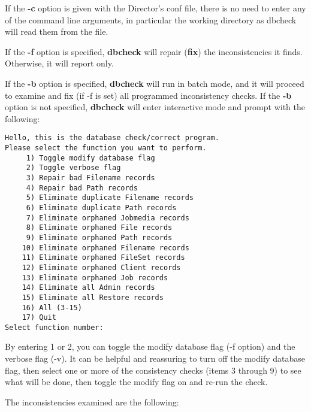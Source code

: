If the {\bf -c} option is given with the Director's conf file, there is no
need to enter any of the command line arguments, in particular the working
directory as dbcheck will read them from the file. 

If the {\bf -f} option is specified, {\bf dbcheck} will repair ({\bf fix}) the
inconsistencies it finds. Otherwise, it will report only. 

If the {\bf -b} option is specified, {\bf dbcheck} will run in batch mode, and
it will proceed to examine and fix (if -f is set) all programmed inconsistency
checks. If the {\bf -b} option is not specified, {\bf dbcheck} will enter
interactive mode and prompt with the following: 

\footnotesize
\begin{verbatim}
Hello, this is the database check/correct program.
Please select the function you want to perform.
     1) Toggle modify database flag
     2) Toggle verbose flag
     3) Repair bad Filename records
     4) Repair bad Path records
     5) Eliminate duplicate Filename records
     6) Eliminate duplicate Path records
     7) Eliminate orphaned Jobmedia records
     8) Eliminate orphaned File records
     9) Eliminate orphaned Path records
    10) Eliminate orphaned Filename records
    11) Eliminate orphaned FileSet records
    12) Eliminate orphaned Client records
    13) Eliminate orphaned Job records
    14) Eliminate all Admin records
    15) Eliminate all Restore records
    16) All (3-15)
    17) Quit
Select function number:
\end{verbatim}
\normalsize

By entering 1 or 2, you can toggle the modify database flag (-f option) and
the verbose flag (-v). It can be helpful and reassuring to turn off the modify
database flag, then select one or more of the consistency checks (items 3
through 9) to see what will be done, then toggle the modify flag on and re-run
the check. 

The inconsistencies examined are the following: 

